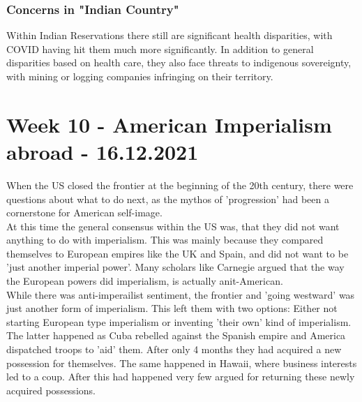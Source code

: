 \documentclass{article}
\begin{document}
	\subsubsection{Concerns in "Indian Country"}
	Within Indian Reservations there still are significant health disparities, with COVID having hit them much more significantly. In addition to general disparities based on health care, they also face threats to indigenous sovereignty, with mining or logging companies infringing on their territory. \\
	
	\newpage
	\section{Week 10 - American Imperialism abroad - 16.12.2021}
	
	When the US closed the frontier at the beginning of the 20th century, there were questions about what to do next, as the mythos of 'progression' had been a cornerstone for American self-image. \\
	At this time the general consensus within the US was, that they did not want anything to do with imperialism. This was mainly because they compared themselves to European empires like the UK and Spain, and did not want to be 'just another imperial power'. Many scholars like Carnegie argued that the way the European powers did imperialism, is actually anit-American. \\
	While there was anti-imperailist sentiment, the frontier and 'going westward' was just another form of imperialism. This left them with two options: Either not starting European type imperialism or inventing 'their own' kind of imperialism. \\
	The latter happened as Cuba rebelled against the Spanish empire and America dispatched troops to 'aid' them. After only 4 months they had acquired a new possession for themselves. The same happened in Hawaii, where business interests led to a coup. After this had happened very few argued for returning these newly acquired possessions. \\
\end{document}
